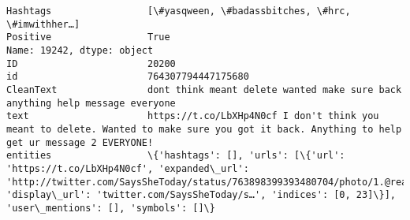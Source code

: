 \documentclass[11pt]{article}
\begin{document}
\begin{Verbatim}[commandchars=\\\{\}]
Hashtags                 [\#yasqween, \#badassbitches, \#hrc, \#imwithher…]                                                                                                                                                                                                                                                                                                                                                                                            
Positive                 True                                                                                                                                                                                                                                                                                                                                                                                                                                      
Name: 19242, dtype: object
ID                       20200                                                                                                                                                                                                                                                                                                                                                                                                 
id                       764307794447175680                                                                                                                                                                                                                                                                                                                                                                                    
CleanText                dont think meant delete wanted make sure back anything help message everyone                                                                                                                                                                                                                                                                                                                          
text                     https://t.co/LbXHp4N0cf I don't think you meant to delete. Wanted to make sure you got it back. Anything to help get ur message 2 EVERYONE!                                                                                                                                                                                                                                                           
entities                 \{'hashtags': [], 'urls': [\{'url': 'https://t.co/LbXHp4N0cf', 'expanded\_url': 'http://twitter.com/SaysSheToday/status/763898399393480704/photo/1.@realDonaldTrump', 'display\_url': 'twitter.com/SaysSheToday/s…', 'indices': [0, 23]\}], 'user\_mentions': [], 'symbols': []\}                                                                                                                            

\end{Verbatim}
\end{document}
